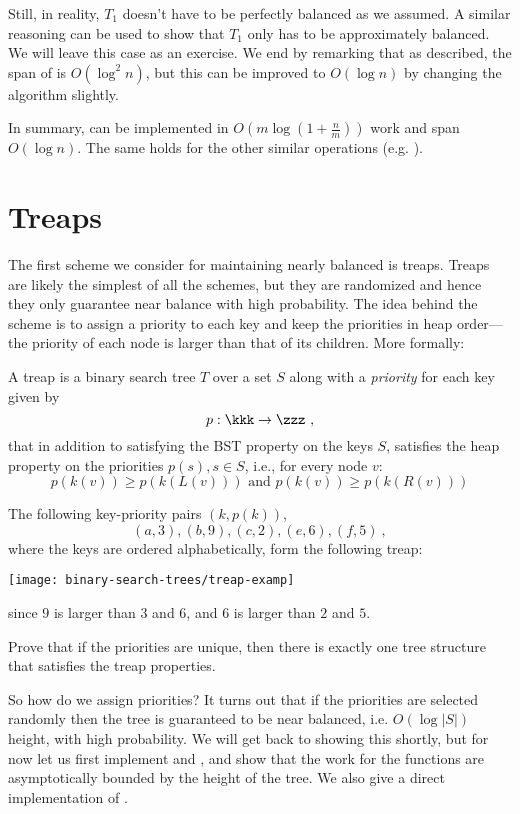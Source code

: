Still, in reality, $T_1$ doesn't have to be perfectly balanced as we
assumed. A similar reasoning can be used to show that $T_1$ only has
to be approximately balanced. We will leave this case as an exercise.
We end by remarking that as described, the span of \cunion{} is
$O(\log^2 n)$, but this can be improved to $O(\log n)$ by changing the
algorithm slightly.

In summary, \cunion{} can be implemented in $O(m \log (1 +
\tfrac{n}m))$ work and span $O(\log n)$.  The same holds for the other
similar operations (e.g. ).

\section{Treaps}

The first scheme we consider for maintaining nearly balanced is
treaps.  Treaps are likely the simplest of all the schemes, but they
are randomized and hence they only guarantee near balance with high
probability.  The idea behind the scheme is to assign a priority to
each key and keep the priorities in heap order---the priority of each
node is larger than that of its children.  More formally:

\begin{definition}[Treap]
A treap is a binary search tree $T$ over a set $S$ along with 
a \emph{priority} for each key given by \[p : \kkk \rightarrow \zzz~,\] that
in addition to satisfying the BST property on the keys $S$, satisfies the 
heap property on the priorities $p(s), s \in S$, i.e., for every node $v$:
\[p(k(v)) \geq p(k(L(v))) \mbox{ and } p(k(v)) \geq p(k(R(v)))\]
\end{definition}

\begin{example}
The following key-priority pairs $(k,p(k))$, 
\[ (a,3), (b,9), (c, 2), (e,6), (f, 5)~,\] where the keys are ordered
alphabetically, form the following treap:
\begin{center}
  \texttt{[image: binary-search-trees/treap-examp]}
\end{center}
since $9$ is larger than $3$ and $6$, and $6$ is larger than $2$ and
$5$.
\end{example}
\begin{exercise}
Prove that if the priorities are unique, then there is exactly one tree
structure that satisfies the treap properties.
\end{exercise}

So how do we assign priorities?  It turns out that if the priorities are
selected randomly then the tree is guaranteed to be near balanced,
i.e. $O(\log |S|)$ height, with high probability.  We will get back to
showing this shortly, but for now let us first implement 
and , and show that the work for the functions
are asymptotically bounded by the height of the tree.  We 
also give a direct implementation of .

